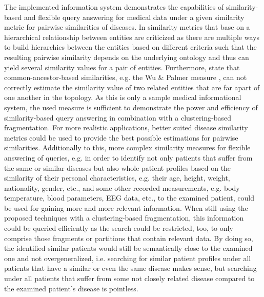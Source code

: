 The implemented information system demonstrates the capabilities of similarity-based and flexible query answering for medical data under a given similarity metric
for pairwise similarities of diseases. In \cite{Mathur2012} similarity metrics that base on a hierarchical relationship between entities are criticized as there
are multiple ways to build hierarchies between the entities based on different criteria such that the resulting pairwise similarity depends on the underlying
ontology and thus can yield several similarity values for a pair of entities. Furthermore, \cite{Mathur2012} state that common-ancestor-based similarities, e.g.
the Wu \& Palmer measure \citep{Wu1994}, can not correctly estimate the similarity value of two related entities that are far apart of one another in the topology.
As this is only a sample medical informational system, the used  measure \citep{McInnes2009} is sufficient to demonstrate the power and 
efficiency of similarity-based query answering in combination with a clustering-based fragmentation. For more realistic applications, better suited disease 
similarity metrics could be used to provide the best possible estimations for pairwise similarities. Additionally to this, more complex similarity measures for
flexible answering of queries, e.g. in order to identify not only patients that suffer from the same or similar diseases but also whole patient profiles based on
the similarity of their personal characteristics, e.g. their age, height, weight, nationality, gender, etc., and some other recorded measurements, e.g. body
temperature, blood parameters, EEG data, etc., to the examined patient, could be used for gaining more and more relevant information. When still using the proposed
techniques with a clustering-based fragmentation, this information could be queried efficiently as the search could be restricted, too, to only comprise those
fragments or partitions that contain relevant data. By doing so, the identified similar patients would still be semantically close to the examined one and not
overgeneralized, i.e. searching for similar patient profiles under all patients that have a similar or even the same disease makes sense, but searching under all
patients that suffer from some not closely related disease compared to the examined patient's disease is pointless.